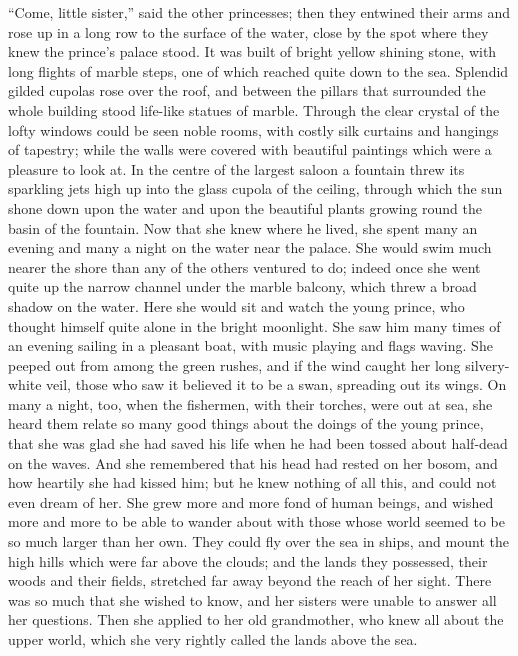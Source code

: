 ``Come, little sister,'' said the other princesses; then they entwined their arms and rose up in a long row to the surface of the water, close by the spot where they knew the prince’s palace stood.
It was built of bright yellow shining stone, with long flights of marble steps, one of which reached quite down to the sea.
Splendid gilded cupolas rose over the roof, and between the pillars that surrounded the whole building stood life-like statues of marble.
Through the clear crystal of the lofty windows could be seen noble rooms, with costly silk curtains and hangings of tapestry; while the walls were covered with beautiful paintings which were a pleasure to look at.
In the centre of the largest saloon a fountain threw its sparkling jets high up into the glass cupola of the ceiling, through which the sun shone down upon the water and upon the beautiful plants growing round the basin of the fountain.
Now that she knew where he lived, she spent many an evening and many a night on the water near the palace.
She would swim much nearer the shore than any of the others ventured to do; indeed once she went quite up the narrow channel under the marble balcony, which threw a broad shadow on the water.
Here she would sit and watch the young prince, who thought himself quite alone in the bright moonlight.
She saw him many times of an evening sailing in a pleasant boat, with music playing and flags waving.
She peeped out from among the green rushes, and if the wind caught her long silvery-white veil, those who saw it believed it to be a swan, spreading out its wings.
On many a night, too, when the fishermen, with their torches, were out at sea, she heard them relate so many good things about the doings of the young prince, that she was glad she had saved his life when he had been tossed about half-dead on the waves.
And she remembered that his head had rested on her bosom, and how heartily she had kissed him; but he knew nothing of all this, and could not even dream of her.
She grew more and more fond of human beings, and wished more and more to be able to wander about with those whose world seemed to be so much larger than her own.
They could fly over the sea in ships, and mount the high hills which were far above the clouds; and the lands they possessed, their woods and their fields, stretched far away beyond the reach of her sight.
There was so much that she wished to know, and her sisters were unable to answer all her questions.
Then she applied to her old grandmother, who knew all about the upper world, which she very rightly called the lands above the sea.

